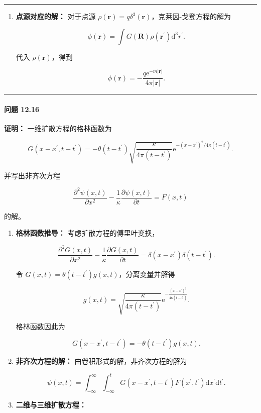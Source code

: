 \begin{center}\rule{0.5\linewidth}{0.5pt}\end{center}

\begin{enumerate}
\def\labelenumi{\arabic{enumi}.}
\setcounter{enumi}{2}
\item
  \textbf{点源对应的解：} 对于点源
  $\rho(\mathbf{r})=q \delta^{3}(\mathbf{r})$，克莱因-戈登方程的解为

  $$
  \phi(\mathbf{r}) = \int G(\mathbf{R}) \rho(\mathbf{r}^{\prime}) \mathrm{d}^{3} r^{\prime}.
  $$

  代入 $\rho(\mathbf{r})$，得到

  $$
  \phi(\mathbf{r}) = -\frac{q \mathrm{e}^{-m |\mathbf{r}|}}{4 \pi |\mathbf{r}|}.
  $$
\end{enumerate}

\begin{center}\rule{0.5\linewidth}{0.5pt}\end{center}

\paragraph{问题 12.16}\label{ux95eeux9898-12.16}

\textbf{证明：} 一维扩散方程的格林函数为

$$
G\left(x-x^{\prime}, t-t^{\prime}\right)=-\theta\left(t-t^{\prime}\right) \sqrt{\frac{\kappa}{4 \pi\left(t-t^{\prime}\right)}} \mathrm{e}^{-\left(x-x^{\prime}\right)^{2} / 4 \kappa\left(t-t^{\prime}\right)}.
$$

并写出非齐次方程

$$
\frac{\partial^{2} \psi(x, t)}{\partial x^{2}}-\frac{1}{\kappa} \frac{\partial \psi(x, t)}{\partial t}=F(x, t)
$$

的解。
\begin{enumerate}

\item
  \textbf{格林函数推导：} 考虑扩散方程的傅里叶变换，

  $$
  \frac{\partial^{2} G(x, t)}{\partial x^{2}}-\frac{1}{\kappa} \frac{\partial G(x, t)}{\partial t} = \delta(x-x^{\prime}) \delta(t-t^{\prime}).
  $$

  令 $G(x, t)=\theta(t-t^{\prime}) g(x, t)$，分离变量并解得

  $$
  g(x, t) = \sqrt{\frac{\kappa}{4 \pi (t-t^{\prime})}} \mathrm{e}^{-\frac{\left(x-x^{\prime}\right)^{2}}{4 \kappa (t-t^{\prime})}}.
  $$

  格林函数因此为

  $$
  G(x-x^{\prime}, t-t^{\prime}) = -\theta(t-t^{\prime}) g(x, t).
  $$

\item
  \textbf{非齐次方程的解：} 由卷积形式的解，非齐次方程的解为

  $$
  \psi(x, t) = \int_{-\infty}^{\infty} \int_{-\infty}^{t} G(x-x^{\prime}, t-t^{\prime}) F(x^{\prime}, t^{\prime}) \mathrm{d} x^{\prime} \mathrm{d} t^{\prime}.
  $$



\item
  \textbf{二维与三维扩散方程：}
\end{enumerate}


